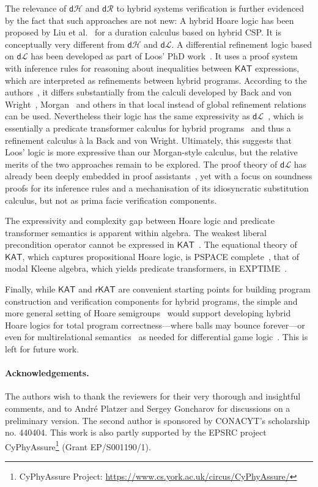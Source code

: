 \documentclass[envcountsame,envcountsect]{llncs}
\newcommand{\KAT}{\mathsf{KAT}}
\newcommand{\rKAT}{\mathsf{rKAT}}
\newcommand{\dL}{\mathsf{d}\mathcal{L}}
\newcommand{\dH}{\mathsf{d}\mathcal{H}}
\newcommand{\dR}{\mathsf{d}\mathcal{R}}
\begin{document}
The relevance of $\dH$ and $\dR$ to hybrid systems verification is
further evidenced by the fact that such approaches are not new: A
hybrid Hoare logic has been proposed by Liu et al.~\cite{LiuLQZZZZ10}
for a duration calculus based on hybrid CSP. It is conceptually very
different from $\dH$ and $\dL$. A differential refinement logic based
on $\dL$ has been developed as part of Loos' PhD work~\cite{LoosP16}.
It uses a proof system with inference rules for reasoning about
inequalities between $\KAT$ expressions, which are interpreted as
refinements between hybrid programs. According to the
authors~\cite{LoosP16}, it differs substantially from the calculi
developed by Back and von Wright~\cite{BackW98},
Morgan~\cite{Morgan94} and others in that local instead of global
refinement relations can be used. Nevertheless their logic has the
same expressivity as $\dL$~\cite{LoosP16}, which is essentially a
predicate transformer calculus for hybrid programs~\cite{MuniveS19}
and thus a refinement calculus \`a la Back and von Wright. Ultimately,
this suggests that Loos' logic is more expressive than our
Morgan-style calculus, but the relative merits of the two approaches
remain to be explored. The proof theory of $\dL$ has already been
deeply embedded in proof assistants~\cite{BohrerRVVP17}, yet with a
focus on soundness proofs for its inference rules and a mechanisation
of its idiosyncratic substitution calculus, but not as prima facie
verification components.

The expressivity and complexity gap between Hoare logic and predicate
transformer semantics is apparent within algebra. The weakest liberal
precondition operator cannot be expressed in $\KAT$~\cite{Struth18}.
The equational theory of $\KAT$, which captures propositional Hoare
logic, is PSPACE complete~\cite{KozenCS96}, that of modal Kleene
algebra, which yields predicate transformers, in
EXPTIME~\cite{MollerS06}.

Finally, while $\KAT$ and $\rKAT$ are convenient starting points for
building program construction and verification components for hybrid
programs, the simple and more general setting of Hoare
semigroups~\cite{Struth18} would support developing hybrid Hoare
logics for total program correctness---where balls may bounce
forever---or even for multirelational
semantics~\cite{FurusawaS16,FurusawaS15} as needed for differential
game logic~\cite{Platzer18}. This is left for future work.

\paragraph{Acknowledgements.}
The authors wish to thank the reviewers for their very thorough and
insightful comments, and to Andr\'e Platzer and Sergey Goncharov for
discussions on a preliminary version. The second author is sponsored
by CONACYT's scholarship no. 440404. This work is also partly
supported by the EPSRC project CyPhyAssure\footnote{CyPhyAssure
  Project: \url{https://www.cs.york.ac.uk/circus/CyPhyAssure/}} (Grant
EP/S001190/1).








\end{document}
